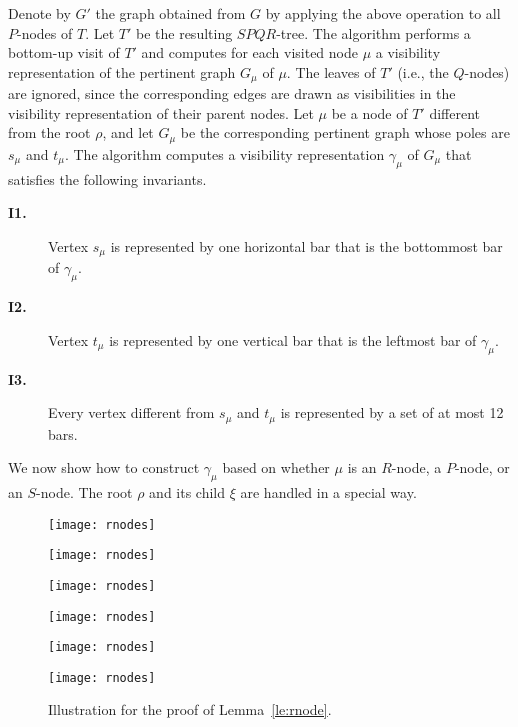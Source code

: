 \documentclass{article}
\begin{document}
Denote by $G'$ the graph obtained from $G$ by applying the above operation to all $P$-nodes of $T$. Let $T'$ be the resulting $SPQR$-tree.  The algorithm performs a bottom-up visit of $T'$ and computes for each visited node $\mu$ a visibility representation of the pertinent graph $G_{\mu}$ of $\mu$. The leaves of $T'$ (i.e.,  the $Q$-nodes) are ignored, since the corresponding edges are drawn as visibilities in the visibility representation of their parent nodes. Let $\mu$ be a node of $T'$ different from the root $\rho$, and let $G_\mu$ be the corresponding pertinent graph whose poles are $s_\mu$ and $t_\mu$. The algorithm computes a visibility representation $\gamma_\mu$ of $G_\mu$ that satisfies the following invariants.


\begin{description}
\item[\bf I1.] Vertex $s_\mu$ is represented by one horizontal bar that is the bottommost bar of $\gamma_\mu$.

\item[\bf I2.] Vertex $t_\mu$ is represented by one vertical bar that is the leftmost bar of $\gamma_\mu$.

\item[\bf I3.] Every vertex different from $s_\mu$ and $t_\mu$ is represented by a set of at most 12 bars.
\end{description}


We now show how to construct $\gamma_\mu$ based on whether $\mu$ is an $R$-node, a $P$-node, or an $S$-node. The root $\rho$ and its child $\xi$ are handled in a special way.

\begin{figure}[t]
    \centering
    \begin{minipage}[b]{.31\textwidth}
    	\centering
    	\texttt{[image: rnodes]}
    	\subcaption{}\label{fi:rnodes-1}
    \end{minipage}
    \begin{minipage}[b]{.31\textwidth}
    	\centering
    	\texttt{[image: rnodes]}
    	\subcaption{}\label{fi:rnodes-2}
    \end{minipage}
    \begin{minipage}[b]{.31\textwidth}
    	\centering
    	\texttt{[image: rnodes]}
    	\subcaption{}\label{fi:rnodes-3}
    \end{minipage}
    \begin{minipage}[b]{.31\textwidth}
    	\centering
    	\texttt{[image: rnodes]}
    	\subcaption{}\label{fi:rnodes-4}
    \end{minipage}
    \begin{minipage}[b]{.31\textwidth}
    	\centering
    	\texttt{[image: rnodes]}
    	\subcaption{}\label{fi:rnodes-5}
    \end{minipage}
    \begin{minipage}[b]{.31\textwidth}
    	\centering
    	\texttt{[image: rnodes]}
    	\subcaption{}\label{fi:rnodes-6}
    \end{minipage}
    \caption{ Illustration for the proof of Lemma~\ref{le:rnode}.}
\end{figure}
\end{document}
